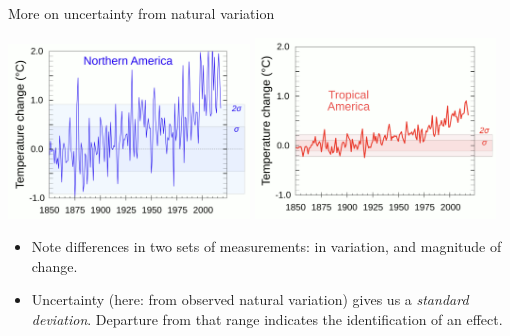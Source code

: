 \documentclass[12pt]{beamer}
\begin{document}
\begin{frame}{More on uncertainty from natural variation}

\begin{center}
\begin{minipage}{\textwidth}
\includegraphics[width=0.48\textwidth]{images/temperature-and-variability_north-america.png}%
\hfill %
\includegraphics[width=0.48\textwidth]{images/temperature-and-variability_tropical-americas.png}
\end{minipage}
\end{center}
%

%
\begin{itemize}
\item Note differences in two sets of measurements: in variation, and magnitude of change.
\item  Uncertainty (here: from observed natural variation) gives us a {\em standard deviation}.  Departure from that range indicates the identification of an effect.
\end{itemize}
%

\end{frame}
\end{document}
